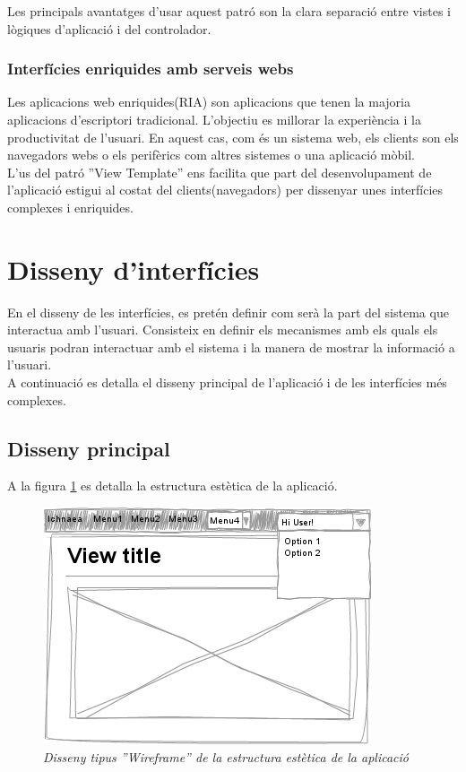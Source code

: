 Les principals avantatges d'usar aquest patró son la clara separació entre vistes i lògiques d'aplicació i del controlador.  

\label{ria}
\subsubsection{Interfícies enriquides amb serveis webs}
Les aplicacions web enriquides(RIA) son aplicacions que tenen la majoria aplicacions d'escriptori tradicional. L'objectiu es millorar la experiència i la productivitat de l'usuari. En aquest cas, com \'{e}s un sistema web, els clients son els navegadors webs o els perifèrics com altres sistemes o una aplicació mòbil.\cite{ria}\\

L'us del patró ''View Template'' ens facilita que part del desenvolupament de l'aplicació estigui al costat del clients(navegadors) per dissenyar unes interfícies complexes i enriquides.\\ 

\section{Disseny d'interf\'{i}cies}
\label{sec:dessigninterfaces}
En el disseny de les interfícies, es pretén definir com serà la part del sistema que interactua amb l’usuari. Consisteix en definir els mecanismes amb els quals els usuaris podran interactuar amb el sistema i la manera de mostrar la informació a l’usuari.\\

A continuació es detalla el disseny principal de l'aplicació i de les interfícies m\'{e}s complexes.

\subsection{Disseny principal}
A la figura \ref{fig:maininterface} es detalla la estructura estètica de la aplicació. 

\begin{figure}[H]
  \centering
  \includegraphics[scale=0.7]{img/design/Maininterface.png}
  \caption{\textit{Disseny tipus ''Wireframe'' de la estructura estètica de la aplicació}}
  \label{fig:maininterface}
\end{figure}

